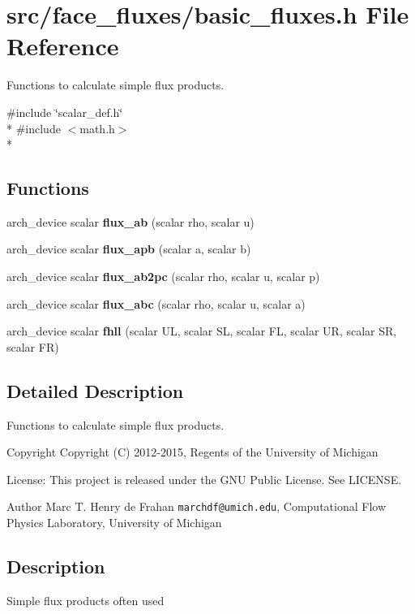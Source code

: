 \section{src/face\-\_\-fluxes/basic\-\_\-fluxes.h File Reference}
\label{basic__fluxes_8h}


Functions to calculate simple flux products.  


{\ttfamily \#include \char`\"{}scalar\-\_\-def.\-h\char`\"{}}\\*
{\ttfamily \#include $<$math.\-h$>$}\\*
\subsection*{Functions}
\begin{DoxyCompactItemize}
\item 
arch\-\_\-device scalar {\bf flux\-\_\-ab} (scalar rho, scalar u)
\item 
arch\-\_\-device scalar {\bf flux\-\_\-apb} (scalar a, scalar b)
\item 
arch\-\_\-device scalar {\bf flux\-\_\-ab2pc} (scalar rho, scalar u, scalar p)
\item 
arch\-\_\-device scalar {\bf flux\-\_\-abc} (scalar rho, scalar u, scalar a)
\item 
arch\-\_\-device scalar {\bf fhll} (scalar U\-L, scalar S\-L, scalar F\-L, scalar U\-R, scalar S\-R, scalar F\-R)
\end{DoxyCompactItemize}


\subsection{Detailed Description}
Functions to calculate simple flux products. \begin{DoxyCopyright}{Copyright}
Copyright (C) 2012-\/2015, Regents of the University of Michigan 
\end{DoxyCopyright}
\begin{DoxyParagraph}{License\-:}
This project is released under the G\-N\-U Public License. See L\-I\-C\-E\-N\-S\-E. 
\end{DoxyParagraph}
\begin{DoxyAuthor}{Author}
Marc T. Henry de Frahan {\tt marchdf@umich.\-edu}, Computational Flow Physics Laboratory, University of Michigan
\end{DoxyAuthor}
\subsection{Description}\label{scalar__def_8h_Description}
Simple flux products often used 

